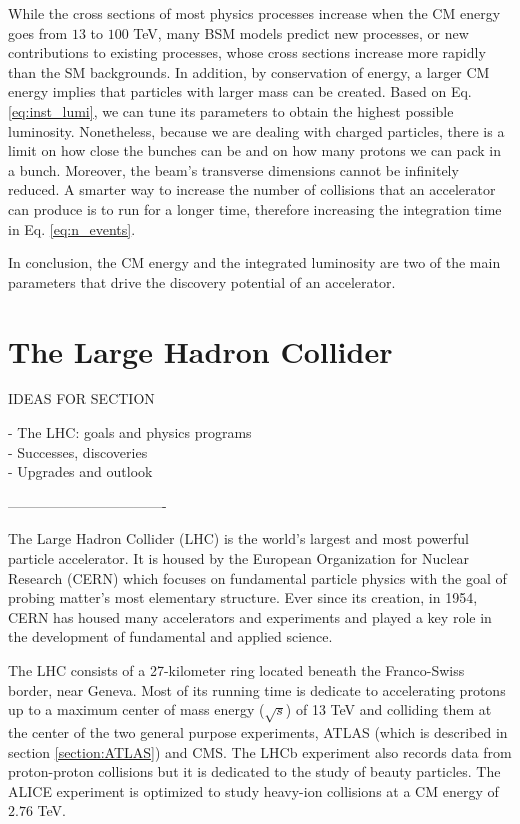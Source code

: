 While the cross sections of most physics processes increase when the CM energy goes from $13$ to $100$ TeV, many BSM models predict new processes, or new contributions to existing processes, whose cross sections increase more rapidly than the SM backgrounds. In addition, by conservation of energy, a larger CM energy implies that particles with larger mass can be created. Based on Eq. \ref{eq:inst_lumi}, we can tune its parameters to obtain the highest possible luminosity. Nonetheless, because we are dealing with charged particles, there is a limit on how close the bunches can be and on how many protons we can pack in a bunch. Moreover, the beam's transverse dimensions cannot be infinitely reduced. A smarter way to increase the number of collisions that an accelerator can produce is to run for a longer time, therefore increasing the integration time in Eq. \ref{eq:n_events}. 

In conclusion, the CM energy and the integrated luminosity are two of the main parameters that drive the discovery potential of an accelerator. 


\section{The Large Hadron Collider}
\label{section:LHC}

IDEAS FOR SECTION

- The LHC: goals and physics programs \\
- Successes, discoveries \\
- Upgrades and outlook

----------------------------------

The Large Hadron Collider (LHC) is the world's largest and most powerful particle accelerator. It is housed by the European Organization for Nuclear Research (CERN) which focuses on fundamental particle physics with the goal of probing matter's most elementary structure. Ever since its creation, in 1954, CERN has housed many accelerators and experiments and played a key role in the development of fundamental and applied science.


The LHC consists of a 27-kilometer ring located beneath the Franco-Swiss border, near Geneva. Most of its running time is dedicate to accelerating protons up to a maximum center of mass energy ($\sqrt s$) of 13 TeV and colliding them at the center of the two general purpose experiments, ATLAS (which is described in section \ref{section:ATLAS}) and CMS. The LHCb experiment also records data from proton-proton collisions but it is dedicated to the study of beauty particles. The ALICE experiment is optimized to study heavy-ion collisions at a CM energy of $2.76$ TeV.

